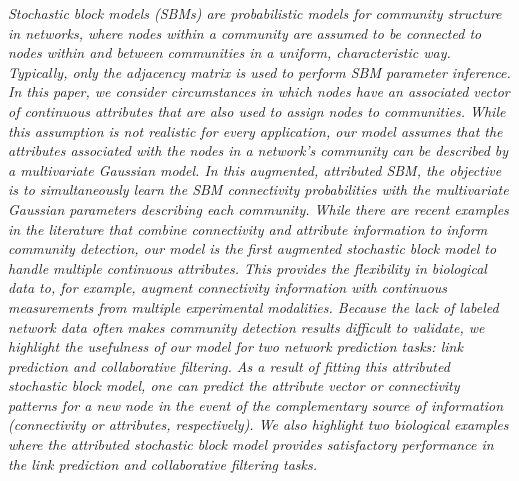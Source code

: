 \emph{Stochastic block models (SBMs) are probabilistic models for community structure in networks, where nodes within a community are assumed to be connected to nodes within and between communities in a uniform, characteristic way.  Typically, only the adjacency matrix is used to perform SBM parameter inference. In this paper, we consider circumstances in which nodes have an associated vector of continuous attributes that are also used to assign nodes to communities. While this assumption is not realistic for every application, our model assumes that the attributes associated with the nodes in a network's community can be described by a multivariate Gaussian model. In this augmented, attributed SBM, the objective is to simultaneously learn the SBM connectivity probabilities with the multivariate Gaussian parameters describing each community. While there are recent examples in the literature that combine connectivity and attribute information to inform community detection, our model is the first augmented stochastic block model to handle multiple continuous attributes. This provides the flexibility in biological data to, for example, augment connectivity information with continuous measurements from multiple experimental modalities. Because the lack of labeled network data often makes community detection results difficult to validate, we highlight the usefulness of our model for two network prediction tasks: link prediction and collaborative filtering. As a result of fitting this attributed stochastic block model, one can predict the attribute vector or connectivity patterns for a new node in the event of the complementary source of information (connectivity or attributes, respectively). We also highlight two biological examples where the attributed stochastic block model provides satisfactory performance in the link prediction and collaborative filtering tasks.}

